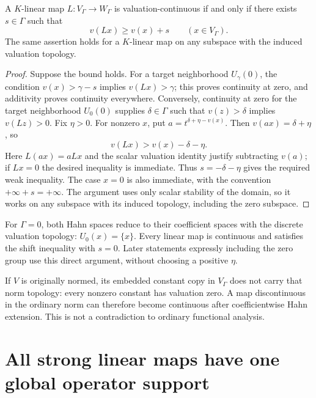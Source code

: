 \documentclass[11pt,letterpaper]{article}
\numberwithin{equation}{section}
\theoremstyle{definition}
\theoremstyle{remark}
\begin{document}
\begin{lemma}
\label{duals:lem:continuous-shift}
A $K$-linear map $L:V_\Gamma\to W_\Gamma$ is valuation-continuous
if and only if there exists $s\in\Gamma$ such that
\begin{equation}\label{duals:eq:shift}
 v(Lx)\ge v(x)+s\qquad(x\in V_\Gamma).
\end{equation}
The same assertion holds for a $K$-linear map on any subspace with the
induced valuation topology.
\end{lemma}
\begin{proof}
Suppose the bound holds. For a target neighborhood $U_\gamma(0)$,
the condition $v(x)>\gamma-s$ implies $v(Lx)>\gamma$; this proves
continuity at zero, and additivity proves continuity everywhere.
Conversely, continuity at zero for the target neighborhood $U_0(0)$
supplies $\delta\in\Gamma$
such that $v(z)>\delta$ implies $v(Lz)>0$. Fix $\eta>0$. For nonzero
$x$, put $a=t^{\delta+\eta-v(x)}$. Then $v(ax)=\delta+\eta$, so
\[
 v(Lx)>v(x)-\delta-\eta.
\]
Here $L(ax)=aLx$ and the scalar valuation identity justify subtracting
$v(a)$; if $Lx=0$ the desired inequality is immediate. Thus
$s=-\delta-\eta$ gives the required weak inequality. The case $x=0$
is also immediate, with the convention $+\infty+s=+\infty$.
The argument uses only scalar stability of the domain, so it works on
any subspace with its induced topology, including the zero subspace.
\end{proof}

For $\Gamma=0$, both Hahn spaces reduce to their coefficient spaces
with the discrete valuation topology: $U_0(x)=\{x\}$. Every linear map
is continuous and satisfies the shift inequality with $s=0$. Later
statements expressly including the zero group use this direct argument,
without choosing a positive $\eta$.

\begin{warning}
If $V$ is originally normed, its embedded constant copy in $V_\Gamma$
does not carry that norm topology: every nonzero constant has valuation
zero. A map discontinuous in the ordinary norm can therefore become
continuous after coefficientwise Hahn extension. This is not a
contradiction to ordinary functional analysis.
\end{warning}

\section{All strong linear maps have one global operator support}
\label{duals:sec:strong}
\end{document}
